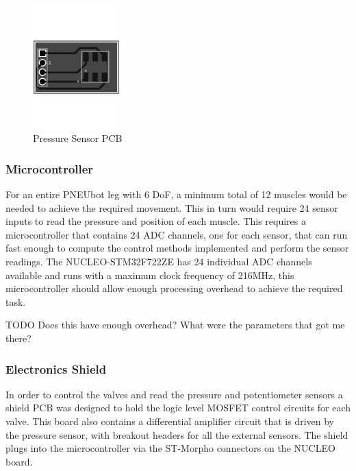 \documentclass[11pt,a4paper]{article}
\begin{document}
\begin{figure}[hbt!]
    \centering
    \includegraphics[angle=270, origin=c, clip, trim=0cm 0cm 0cm 0cm, width=0.3\textwidth]{PressureSensorPCB.pdf}
    \caption{Pressure Sensor PCB}
    \label{fig:pres_sense}
\end{figure}

\subsubsection{Microcontroller}
\label{sub:microcontroller}

For an entire PNEUbot leg with 6 DoF, a minimum total of 12 muscles would be needed to achieve the required movement. This in turn would require 24 sensor inputs to read the pressure and position of each muscle. This requires a microcontroller that contains 24 ADC channels, one for each sensor, that can run fast enough to compute the control methods implemented and perform the sensor readings. The NUCLEO-STM32F722ZE \cite{nucleo_stm32f722ze} has 24 individual ADC channels available and runs with a maximum clock frequency of 216MHz, this microcontroller should allow enough processing overhead to achieve the required task.

\newline TODO Does this have enough overhead? What were the parameters that got me there?
\newline %
\newline %
\newline %
\newline %
\newline %

\subsubsection{Electronics Shield}
\label{sub:shield}

In order to control the valves and read the pressure and potentiometer sensors a shield PCB  was designed to hold the logic level MOSFET control circuits for each valve. This board also contains a differential amplifier circuit that is driven by the pressure sensor, with breakout headers for all the external sensors. The shield plugs into the microcontroller via the ST-Morpho connectors on the NUCLEO board.
\end{document}
